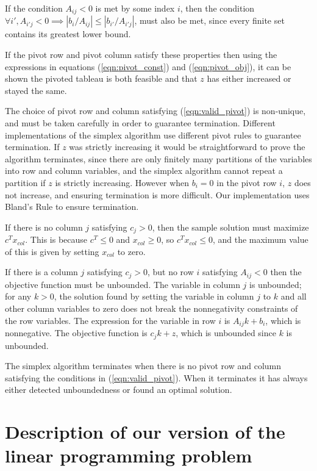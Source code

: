 \documentclass[11pt]{article} %
\begin{document}
If the condition $A_{ij} < 0$ is met by some index $i$, then the condition $\forall i', A_{i'j} < 0 \implies \left|b_i/A_{ij}\right| \le \left|b_{i'} / A_{i'j}\right|$, must also be met, since every finite set contains its greatest lower bound.

If the pivot row and pivot column satisfy these properties then using the expressions in equations (\ref{eqn:pivot_const}) and (\ref{eqn:pivot_obj}), it can be shown the pivoted tableau is both feasible and that $z$ has either increased or stayed the same.

The choice of pivot row and column satisfying (\ref{eqn:valid_pivot}) is non-unique, and must be taken carefully in order to guarantee termination. Different implementations of the simplex algorithm use different pivot rules to guarantee termination. If $z$ was strictly increasing it would be straightforward to prove the algorithm terminates, since there are only finitely many partitions of the variables into row and column variables, and the simplex algorithm cannot repeat a partition if $z$ is strictly increasing. However when $b_i = 0$ in the pivot row $i$, $z$ does not increase, and ensuring termination is more difficult. Our implementation uses Bland's Rule \cite{Blands_rule} to ensure termination.

If there is no column $j$ satisfying $c_j > 0$, then the sample solution must maximize $c^Tx_{col}$. This is because $c^T \le 0$ and $x_{col} \ge 0$, so $c^Tx_{col} \le 0$, and the maximum value of this is given by setting $x_{col}$ to zero.

If there is a column $j$ satisfying $c_j > 0$, but no row $i$ satisfying $A_{ij} < 0$ then the objective function must be unbounded. The variable in column $j$ is unbounded; for any $k > 0$, the solution found by setting the variable in column $j$ to $k$ and all other column variables to zero does not break the nonnegativity constraints of the row variables. The expression for the variable in row $i$ is $A_{ij}k + b_i$, which is nonnegative. The objective function is $c_jk+z$, which is unbounded since $k$ is unbounded.

The simplex algorithm terminates when there is no pivot row and column satisfying the conditions in (\ref{eqn:valid_pivot}). When it terminates it has always either detected unboundedness or found an optimal solution.

\section{Description of our version of the linear programming problem}
\end{document}
